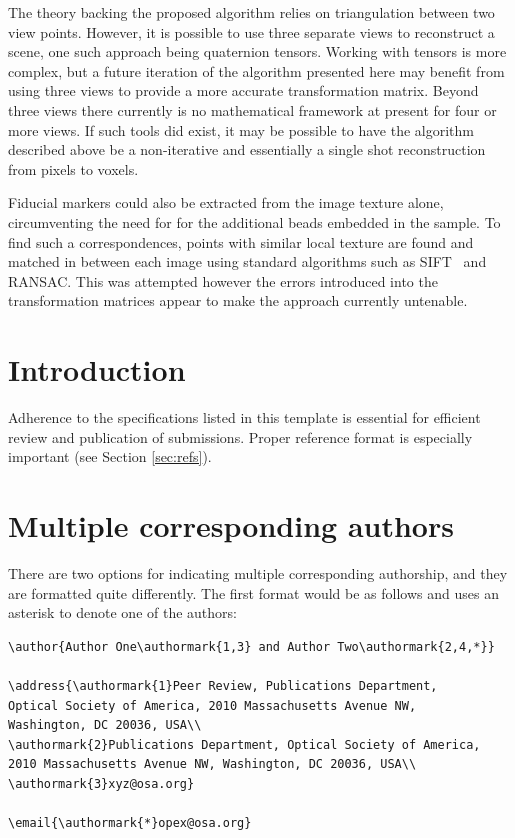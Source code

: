 \documentclass{osa-article}
\begin{document}
The theory backing the proposed algorithm relies on triangulation between two view points.
However, it is possible to use three separate views %
to reconstruct a scene, one such approach being quaternion tensors.
Working with tensors is more complex, but a future iteration of the algorithm presented here may benefit from using three views to provide a more accurate transformation matrix.
Beyond three views there currently is no mathematical framework at present for four or more views.
If such tools did exist, it may be possible to have the algorithm described above be a non-iterative and essentially a single shot reconstruction from pixels to voxels.

Fiducial markers could also be extracted from the image texture alone, circumventing the need for for the additional beads embedded in the sample.
To find such a correspondences, points with similar local texture are found and matched in between each image using standard algorithms such as SIFT~\cite{} and RANSAC\cite{}. %
This was attempted however the errors introduced into the transformation matrices appear to make the approach currently untenable.

\pagebreak

\section{Introduction}
Adherence to the specifications listed in this template is essential for efficient review and publication of submissions. Proper reference format is especially important (see Section \ref{sec:refs}).

\section{Multiple corresponding authors}

There are two options for indicating multiple corresponding authorship, and they are formatted quite differently. The first format would be as follows and uses an asterisk to denote one of the authors:

\begin{verbatim}
\author{Author One\authormark{1,3} and Author Two\authormark{2,4,*}}

\address{\authormark{1}Peer Review, Publications Department,
Optical Society of America, 2010 Massachusetts Avenue NW,
Washington, DC 20036, USA\\
\authormark{2}Publications Department, Optical Society of America,
2010 Massachusetts Avenue NW, Washington, DC 20036, USA\\
\authormark{3}xyz@osa.org}

\email{\authormark{*}opex@osa.org}
\end{verbatim}
\end{document}
